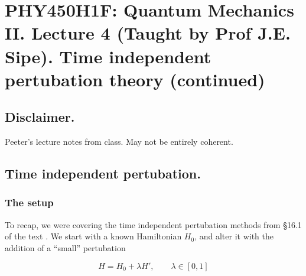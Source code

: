 
%

\chapter{PHY450H1F: Quantum Mechanics II.  Lecture 4 (Taught by Prof J.E. Sipe).  Time independent pertubation theory (continued)}
\label{chap:qmTwoL4}
{}
\date{Sept 21, 2011}

\beginArtWithToc

\section{Disclaimer.}

Peeter's lecture notes from class.  May not be entirely coherent.

\section{Time independent pertubation.}
\subsection{The setup}

To recap, we were covering the time independent pertubation methods from \S 16.1 of the text \cite{desai2009quantum}.  We start with a known Hamiltonian $H_0$, and alter it with the addition of a ``small'' pertubation

\begin{equation}\label{eqn:qmTwoL4:10}
H = H_0 + \lambda H', \qquad \lambda \in [0,1]
\end{equation}

